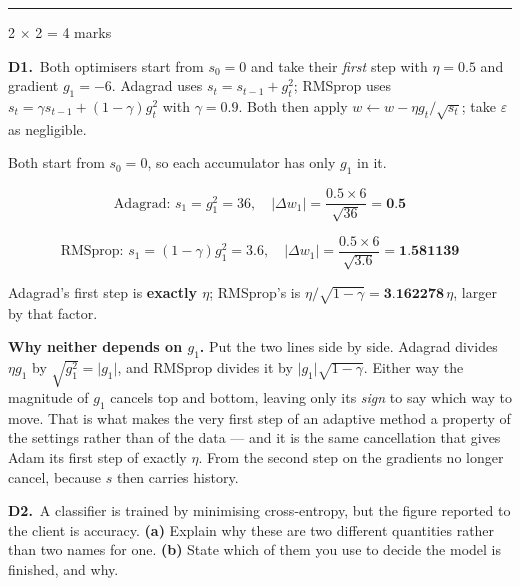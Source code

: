 \documentclass[10pt,a4paper]{article}
\newcommand{\parthead}[2]{\vspace{2pt}\noindent\rule{\linewidth}{0.4pt}\par\vspace{2pt}%
  \noindent{\bfseries Part #1}\hfill{\small #2}\par\vspace{1pt}}
\newcommand{\sol}[1]{\textbf{#1}}
\begin{document}
\newpage

\parthead{D --- Short answer}{2 $\times$ 2 = 4 marks}

\textbf{D1.}\ Both optimisers start from $s_0 = 0$ and take their \emph{first} step with $\eta = 0.5$ and gradient $g_1 = -6$. Adagrad uses $s_t = s_{t-1} + g_t^2$; RMSprop uses $s_t = \gamma s_{t-1} + (1-\gamma) g_t^2$ with $\gamma = 0.9$. Both then apply $w \leftarrow w - \eta g_t / \sqrt{s_t}$; take $\varepsilon$ as negligible.

\vspace{2pt}

Both start from $s_0 = 0$, so each accumulator has only $g_1$ in it.

\[ \text{Adagrad: } s_1 = g_1^2 = 36, \quad \lvert \Delta w_1 \rvert = \frac{0.5 \times 6}{\sqrt{36}} = \sol{0.5} \]

\[ \text{RMSprop: } s_1 = (1-\gamma) g_1^2 = 3.6, \quad \lvert \Delta w_1 \rvert = \frac{0.5 \times 6}{\sqrt{3.6}} = \sol{1.581139} \]

Adagrad's first step is \sol{exactly $\eta$}; RMSprop's is $\eta/\sqrt{1-\gamma} = \sol{3.162278}\,\eta$, larger by that factor.

\vspace{2pt}

\textbf{Why neither depends on $g_1$.} Put the two lines side by side. Adagrad divides $\eta g_1$ by $\sqrt{g_1^2} = \lvert g_1 \rvert$, and RMSprop divides it by $\lvert g_1 \rvert \sqrt{1-\gamma}$. Either way the magnitude of $g_1$ cancels top and bottom, leaving only its \emph{sign} to say which way to move. That is what makes the very first step of an adaptive method a property of the settings rather than of the data --- and it is the same cancellation that gives Adam its first step of exactly $\eta$. From the second step on the gradients no longer cancel, because $s$ then carries history.

\vspace{6pt}

\textbf{D2.}\ A classifier is trained by minimising cross-entropy, but the figure reported to the client is accuracy. \textbf{(a)} Explain why these are two different quantities rather than two names for one. \textbf{(b)} State which of them you use to decide the model is finished, and why.

\vspace{2pt}
\end{document}
